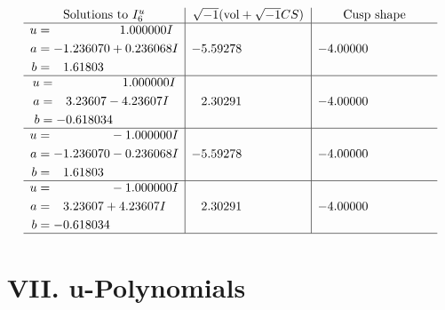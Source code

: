 \documentclass[1p]{elsarticle_modified}
\theoremstyle{definition}
\newcommand{\I}{\sqrt{-1}}
\begin{document}
$$\begin{array}{c|c|c}  
\text{Solutions to }I^u_{6}& \I (\text{vol} + \sqrt{-1}CS) & \text{Cusp shape}\\
 \hline 
\begin{aligned}
u &= \phantom{-0.000000 -}1.000000 I \\
a &= -1.236070 + 0.236068 I \\
b &= \phantom{-}1.61803\phantom{ +0.000000I}\end{aligned}
 & -5.59278\phantom{ +0.000000I} & -4.00000\phantom{ +0.000000I} \\ \hline\begin{aligned}
u &= \phantom{-0.000000 -}1.000000 I \\
a &= \phantom{-}3.23607 - 4.23607 I \\
b &= -0.618034\phantom{ +0.000000I}\end{aligned}
 & \phantom{-}2.30291\phantom{ +0.000000I} & -4.00000\phantom{ +0.000000I} \\ \hline\begin{aligned}
u &= \phantom{-0.000000 } -1.000000 I \\
a &= -1.236070 - 0.236068 I \\
b &= \phantom{-}1.61803\phantom{ +0.000000I}\end{aligned}
 & -5.59278\phantom{ +0.000000I} & -4.00000\phantom{ +0.000000I} \\ \hline\begin{aligned}
u &= \phantom{-0.000000 } -1.000000 I \\
a &= \phantom{-}3.23607 + 4.23607 I \\
b &= -0.618034\phantom{ +0.000000I}\end{aligned}
 & \phantom{-}2.30291\phantom{ +0.000000I} & -4.00000\phantom{ +0.000000I}\\
 \hline 
 \end{array}$$\newpage
\newpage\renewcommand{\arraystretch}{1}
\centering \section*{ VII. u-Polynomials}
\end{document}
